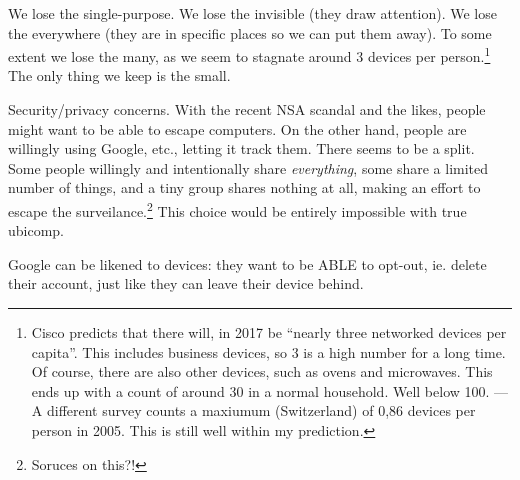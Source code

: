 We lose the single-purpose. We lose the invisible (they draw attention). We lose the everywhere (they are in specific places
so we can put them away). To some extent we lose the many, as we seem to stagnate around 3 devices per person.\footnote{Cisco
predicts that there will, in 2017 be ``nearly three networked devices per capita''. This includes business devices, so 3 is a
high number for a long time.\cite{cisco} Of course, there are also other devices, such as ovens and microwaves. This ends up
with a count of around 30 in a normal household. Well below 100. --- A different survey counts a maxiumum (Switzerland) of
0,86 devices per person in 2005. This is still well within my prediction.\cite{nationmaster}} The only thing we keep is the small.

Security/privacy concerns. With the recent NSA scandal and the likes, people might want to be able to escape computers.
On the other hand, people are willingly using Google, etc., letting it track them. There seems to be a split. Some people
willingly and intentionally share \emph{everything}, some share a limited number of things, and a tiny group shares nothing
at all, making an effort to escape the surveilance.\footnote{Soruces on this?!} This choice would be entirely impossible
with true ubicomp.

Google can be likened to devices: they want to be ABLE to opt-out, ie. delete their account, just like they can leave their device behind.